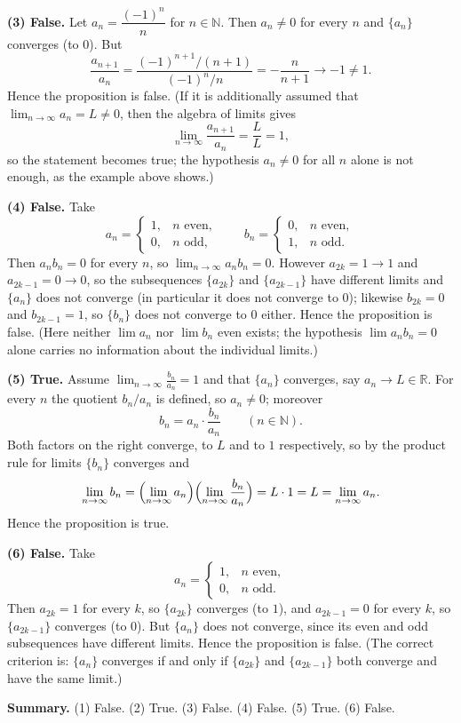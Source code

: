 \documentclass[11pt,a4paper]{article}
\newenvironment{solution}[1]{%
  \par\addvspace{1.7ex}%
  \noindent{\color{solutioncolor}\textbf{#1}}\hspace{0.55em}\ignorespaces}%
  {\par\addvspace{0.9ex}}
\begin{document}
\begin{solution}{Solution 2.1.2}
\medskip
\noindent\textbf{(3) False.}
Let $a_n=\dfrac{(-1)^{n}}{n}$ for $n\in\mathbb{N}$. Then $a_n\ne0$ for every $n$
and $\{a_n\}$ converges (to $0$). But
\[
  \frac{a_{n+1}}{a_n}
  =\frac{(-1)^{n+1}/(n+1)}{(-1)^{n}/n}
  =-\frac{n}{n+1}\longrightarrow-1\ne1 .
\]
Hence the proposition is false. (If it is additionally assumed that
$\lim_{n\to\infty}a_n=L\ne0$, then the algebra of limits gives
\[
  \lim_{n\to\infty}\frac{a_{n+1}}{a_n}=\frac{L}{L}=1,
\]
so the statement becomes true; the hypothesis $a_n\ne0$ for all $n$ alone is not
enough, as the example above shows.)

\medskip
\noindent\textbf{(4) False.}
Take
\[
  a_n=\begin{cases}1, & n \text{ even},\\[2pt] 0, & n \text{ odd},\end{cases}
  \qquad
  b_n=\begin{cases}0, & n \text{ even},\\[2pt] 1, & n \text{ odd}.\end{cases}
\]
Then $a_nb_n=0$ for every $n$, so $\lim_{n\to\infty}a_nb_n=0$. However
$a_{2k}=1\to1$ and $a_{2k-1}=0\to0$, so the subsequences $\{a_{2k}\}$ and
$\{a_{2k-1}\}$ have different limits and $\{a_n\}$ does not converge (in
particular it does not converge to $0$); likewise $b_{2k}=0$ and
$b_{2k-1}=1$, so $\{b_n\}$ does not converge to $0$ either. Hence the
proposition is false. (Here neither $\lim a_n$ nor $\lim b_n$ even exists; the
hypothesis $\lim a_nb_n=0$ alone carries no information about the individual
limits.)

\medskip
\noindent\textbf{(5) True.}
Assume $\displaystyle\lim_{n\to\infty}\frac{b_n}{a_n}=1$ and that $\{a_n\}$
converges, say $a_n\to L\in\mathbb{R}$. For every $n$ the quotient $b_n/a_n$ is
defined, so $a_n\ne0$; moreover
\[
  b_n=a_n\cdot\frac{b_n}{a_n}\qquad(n\in\mathbb{N}).
\]
Both factors on the right converge, to $L$ and to $1$ respectively, so by the
product rule for limits $\{b_n\}$ converges and
\[
  \lim_{n\to\infty}b_n=\Bigl(\lim_{n\to\infty}a_n\Bigr)
  \Bigl(\lim_{n\to\infty}\frac{b_n}{a_n}\Bigr)=L\cdot1=L=\lim_{n\to\infty}a_n .
\]
Hence the proposition is true.

\medskip
\noindent\textbf{(6) False.}
Take
\[
  a_n=\begin{cases}1, & n \text{ even},\\[2pt] 0, & n \text{ odd}.\end{cases}
\]
Then $a_{2k}=1$ for every $k$, so $\{a_{2k}\}$ converges (to $1$), and
$a_{2k-1}=0$ for every $k$, so $\{a_{2k-1}\}$ converges (to $0$). But $\{a_n\}$
does not converge, since its even and odd subsequences have different limits.
Hence the proposition is false. (The correct criterion is: $\{a_n\}$ converges
if and only if $\{a_{2k}\}$ and $\{a_{2k-1}\}$ both converge and have the same
limit.)

\medskip
\noindent\textbf{Summary.} (1) False. (2) True. (3) False. (4) False.
(5) True. (6) False.
\end{solution}
\end{document}
